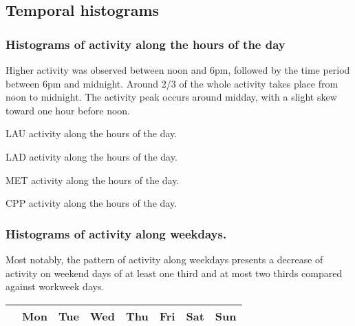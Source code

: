\FloatBarrier
\subsection{Temporal histograms}
\subsubsection{Histograms of activity along the hours of the day}\label{si:hours}

Higher activity was observed between noon and 6pm, followed by the time period between 6pm and midnight.
Around 2/3 of the whole activity takes place from noon to midnight.
The activity peak occurs around midday, with a slight skew toward one hour before noon.
\begin{table}[!h]
	\caption{LAU activity along the hours of the day.}
	\footnotesize
	
\end{table}

\begin{table}[!h]
	\caption{LAD activity along the hours of the day.}
	\footnotesize
	
\end{table}

\begin{table}[!h]
	\caption{MET activity along the hours of the day.}
	\footnotesize
	
\end{table}

\begin{table}[!h]
	\caption{CPP activity along the hours of the day.}
	\footnotesize
	
\end{table}

\FloatBarrier

\subsubsection{Histograms of activity along weekdays.}
Most notably, the pattern of activity along weekdays presents
a decrease of activity on weekend days of at least one third and at most two thirds
compared against workweek days.

\begin{table}[!h]
\begin{center}
    \begin{tabular}{ | l ||  c | c | c | c | c |   c | c |}
        \hline
        & Mon & Tue & Wed & Thu & Fri & Sat & Sun  \\ \hline
	
    \end{tabular}
\end{center}
\label{tab:win}
\end{table}

